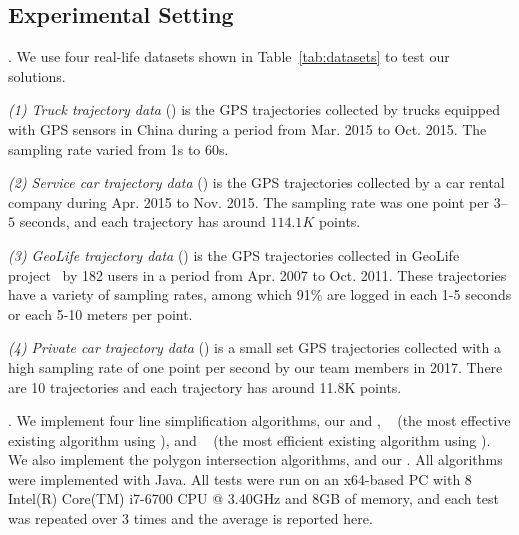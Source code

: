 \subsection{Experimental Setting}

.
We use four real-life datasets shown in Table~\ref{tab:datasets} to test our solutions.

\vspace{0.5ex}
\ni \emph{(1) Truck trajectory data} (\truck) is the GPS trajectories collected by  trucks equipped with GPS sensors in China
during a period from Mar. 2015 to Oct. 2015. The sampling rate varied from 1s to 60s.

\vspace{0.5ex}
\ni \emph{(2) Service car trajectory data} (\sercar) is the GPS trajectories collected by a car rental company during Apr. 2015 to Nov. 2015. The sampling rate was one point per $3$--$5$ seconds, and
each trajectory has around $114.1K$ points.

\vspace{0.5ex}
\ni \emph{(3) GeoLife trajectory data} (\geolife) is the GPS trajectories collected in GeoLife project~\cite{Zheng:GeoLife} by 182 users in a period from Apr. 2007 to Oct. 2011. These trajectories have a variety of sampling rates, among which 91\% are logged in each 1-5 seconds or each 5-10 meters per point.

\vspace{0.5ex}
\ni \emph{(4) Private car trajectory data} (\pricar) is a small set GPS trajectories  collected with a high sampling rate of one point per second by our team members in 2017. There are 10 trajectories and each trajectory has around 11.8K points.






.
We implement four line simplification algorithms, \ie our \cist and \cista, \dps~\cite{Meratnia:Spatiotemporal} (the most effective existing \lsa algorithm using \sed), and \squishe~\cite{Muckell:Compression} (the most efficient existing \lsa algorithm using \sed).
We also implement the polygon intersection algorithms, \cpia and our \rpia.
All algorithms were implemented with Java.
All tests were run on an {x64-based  PC with 8 Intel(R) Core(TM) i7-6700 CPU @ 3.40GHz and 8GB of memory, and each test was repeated
over 3 times and the average is reported here}.





